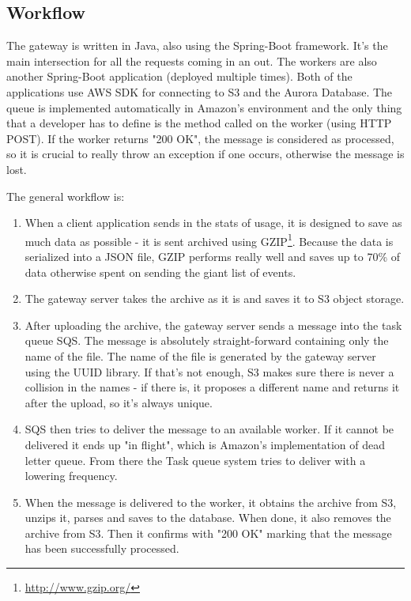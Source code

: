 \subsection{Workflow}

The gateway is written in Java, also using the Spring-Boot framework. It's the main intersection for all the requests coming in an out. The workers are also another Spring-Boot application (deployed multiple times). Both of the applications use AWS SDK for connecting to S3 and the Aurora Database. The queue is implemented automatically in Amazon's environment and the only thing that a developer has to define is the method called on the worker (using HTTP POST). If the worker returns "200 OK", the message is considered as processed, so it is crucial to really throw an exception if one occurs, otherwise the message is lost.

\newpage

The general workflow is:

\begin{enumerate}
	\item When a client application sends in the stats of usage, it is designed to save as much data as possible - it is sent archived using GZIP\footnote{\url{http://www.gzip.org/}}. Because the data is serialized into a JSON file, GZIP performs really well and saves up to 70\% of data otherwise spent on sending the giant list of events.
	\item The gateway server takes the archive as it is and saves it to S3 object storage.
	\item After uploading the archive, the gateway server sends a message into the task queue SQS. The message is absolutely straight-forward containing only the name of the file. The name of the file is generated by the gateway server using the UUID library. If that's not enough, S3 makes sure there is never a collision in the names - if there is, it proposes a different name and returns it after the upload, so it's always unique.
	\item SQS then tries to deliver the message to an available worker. If it cannot be delivered it ends up "in flight", which is Amazon's implementation of dead letter queue. From there the Task queue system tries to deliver with a lowering frequency.
	\item When the message is delivered to the worker, it obtains the archive from S3, unzips it, parses and saves to the database. When done, it also removes the archive from S3. Then it confirms with "200 OK" marking that the message has been successfully processed.
\end{enumerate}

